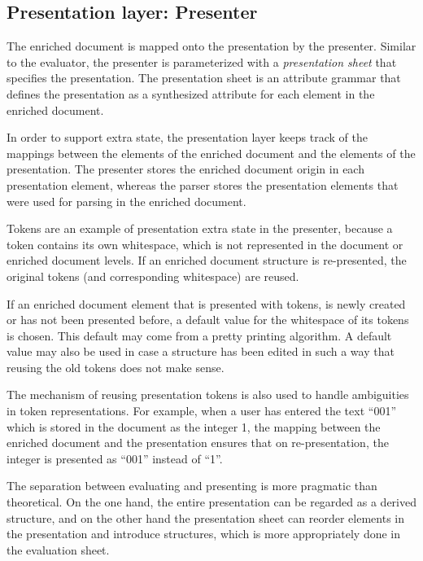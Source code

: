 \documentclass{speauth}
\begin{document}
%																
\subsection{Presentation layer: Presenter} \label{sect:presenter}

The enriched document is mapped onto the presentation by the presenter. Similar to the evaluator, the presenter is parameterized with a {\em presentation sheet} that specifies the presentation. The presentation sheet is an attribute grammar that defines the presentation as a synthesized attribute for each element in the enriched document. 

In order to support extra state, the presentation layer keeps track of the mappings between the elements of the enriched document and the elements of the presentation. The presenter stores the enriched document origin in each presentation element, whereas the parser stores the presentation elements that were used for parsing in the enriched document.

Tokens are an example of presentation extra state in the presenter, because a token contains its own whitespace, which is not represented in the document or enriched document levels. If an enriched document structure is re-presented, the original tokens (and corresponding white\-space) are reused. 

If an enriched document element that is presented with tokens, is newly created or has not been presented before, a default value for the whitespace of its tokens is chosen. This default may come from a pretty printing algorithm. A default value may also be used in case a structure has been edited in such a way that reusing the old tokens does not make sense.

The mechanism of reusing presentation tokens is also used to handle ambiguities in token representations. For example, when a user has entered the text ``001'' which is stored in the document as the integer 1, the mapping between the enriched document and the presentation ensures that on re-presentation, the integer is presented as ``001'' instead of ``1''.

The separation between evaluating and presenting is more pragmatic than theoretical. On the one hand, the entire presentation can be regarded as a derived structure, and on the other hand the presentation sheet can reorder elements in the presentation and introduce structures, which is more appropriately done in the evaluation sheet. 
\end{document}
